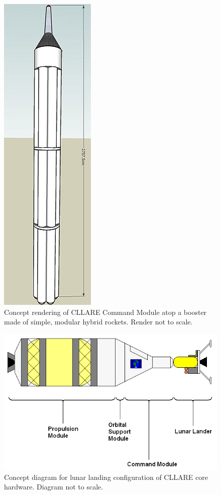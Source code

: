 \documentclass{report}
\begin{document}
\begin{figure}[h] \label{fig:cm_on_modular_booster}
\centering
\includegraphics[scale=0.6]{images/cm_on_modular_booster}
\caption{Concept rendering of CLLARE Command Module atop a booster made of simple, modular hybrid rockets.  Render not to scale.}
\end{figure}

\begin{figure}[h] \label{fig:cllare_lunar_landing_config}
\centering
\includegraphics[scale=0.6]{images/cllare_lunar_landing_config}
\caption{Concept diagram for lunar landing configuration of CLLARE core hardware.  Diagram not to scale.}

\end{figure}
\end{document}
